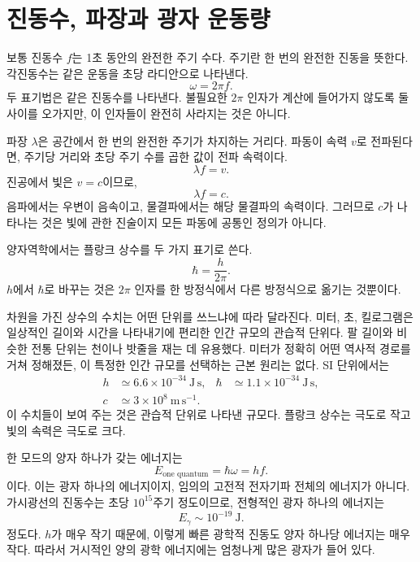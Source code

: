 \section{진동수, 파장과 광자 운동량}

보통 진동수 \(f\)는 1초 동안의 완전한 주기 수다. 주기란 한 번의 완전한 진동을 뜻한다. 각진동수는 같은 운동을 초당 라디안으로 나타낸다. \begin{equation}
\omega=2\pi f.
\end{equation}두 표기법은 같은 진동수를 나타낸다. 불필요한 \(2\pi\) 인자가 계산에 들어가지 않도록 둘 사이를 오가지만, 이 인자들이 완전히 사라지는 것은 아니다.

파장 \(\lambda\)은 공간에서 한 번의 완전한 주기가 차지하는 거리다. 파동이 속력 \(v\)로 전파된다면, 주기당 거리와 초당 주기 수를 곱한 값이 전파 속력이다. \begin{equation}
\lambda f=v.
\end{equation}진공에서 빛은 \(v=c\)이므로, \begin{equation}
\lambda f=c.
\end{equation}음파에서는 우변이 음속이고, 물결파에서는 해당 물결파의 속력이다. 그러므로 \(c\)가 나타나는 것은 빛에 관한 진술이지 모든 파동에 공통인 정의가 아니다.

양자역학에서는 플랑크 상수를 두 가지 표기로 쓴다. \begin{equation}
\hbar=\frac{h}{2\pi}.
\end{equation}\(h\)에서 \(\hbar\)로 바꾸는 것은 \(2\pi\) 인자를 한 방정식에서 다른 방정식으로 옮기는 것뿐이다.

차원을 가진 상수의 수치는 어떤 단위를 쓰느냐에 따라 달라진다. 미터, 초, 킬로그램은 일상적인 길이와 시간을 나타내기에 편리한 인간 규모의 관습적 단위다. 팔 길이와 비슷한 전통 단위는 천이나 밧줄을 재는 데 유용했다. 미터가 정확히 어떤 역사적 경로를 거쳐 정해졌든, 이 특정한 인간 규모를 선택하는 근본 원리는 없다. SI 단위에서는 \begin{equation}
\begin{aligned}
h &\simeq 6.6\times10^{-34}\ \mathrm{J\,s},
&\hbar &\simeq 1.1\times10^{-34}\ \mathrm{J\,s},\\
c &\simeq 3\times10^8\ \mathrm{m\,s^{-1}}.
\end{aligned}
\end{equation}이 수치들이 보여 주는 것은 관습적 단위로 나타낸 규모다. 플랑크 상수는 극도로 작고 빛의 속력은 극도로 크다.

한 모드의 양자 하나가 갖는 에너지는 \begin{equation}
E_{\text{one quantum}}=\hbar\omega=hf.
\end{equation}이다. 이는 광자 하나의 에너지이지, 임의의 고전적 전자기파 전체의 에너지가 아니다. 가시광선의 진동수는 초당 \(10^{15}\)주기 정도이므로, 전형적인 광자 하나의 에너지는 \begin{equation}
E_\gamma\sim 10^{-19}\ \mathrm{J}.
\end{equation}정도다. \(h\)가 매우 작기 때문에, 이렇게 빠른 광학적 진동도 양자 하나당 에너지는 매우 작다. 따라서 거시적인 양의 광학 에너지에는 엄청나게 많은 광자가 들어 있다.

